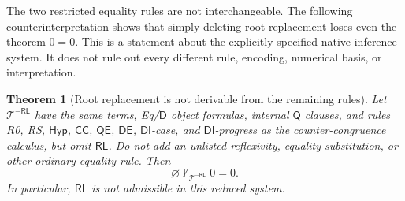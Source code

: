 \documentclass[11pt,letterpaper]{article}
\newtheorem{theorem}{Theorem}[section]
\theoremstyle{definition}\newtheorem{definition}[theorem]{Definition}
\theoremstyle{remark}\newtheorem{remark}[theorem]{Remark}
\begin{document}
The two restricted equality rules are not interchangeable. The following
counterinterpretation shows that simply deleting root replacement loses
even the theorem $0=0$. This is a statement about the explicitly specified
native inference system. It does not rule out every different rule,
encoding, numerical basis, or interpretation.

\begin{theorem}[Root replacement is not derivable from the remaining rules]
\label{rootind:theorem}
Let $\mathcal T^{-\mathsf{RL}}$ have the same terms, Eq/$\mathsf D$
object formulas, internal $\mathsf Q$ clauses, and rules R0, RS,
$\mathsf{Hyp}$, $\mathsf{CC}$, $\mathsf{QE}$, $\mathsf{DE}$,
$\mathsf{DI}$-case, and $\mathsf{DI}$-progress as the counter-congruence
calculus, but omit $\mathsf{RL}$. Do not add an unlisted reflexivity,
equality-substitution, or other ordinary equality rule. Then
\[
                    \varnothing\nvdash_{\mathcal T^{-\mathsf{RL}}}0=0.
\]
In particular, $\mathsf{RL}$ is not admissible in this reduced system.
\end{theorem}
\end{document}
